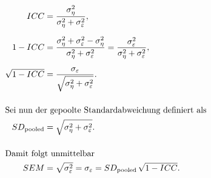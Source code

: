 \documentclass{article}
\begin{document}
\begin{align*}
ICC &= \frac{\sigma_{\eta}^{2}}{\sigma_{\eta}^{2} + \sigma_{\varepsilon}^{2}}, \\[6pt]
1 - ICC &= \frac{\sigma_{\eta}^{2} + \sigma_{\varepsilon}^{2} - \sigma_{\eta}^{2}}
               {\sigma_{\eta}^{2} + \sigma_{\varepsilon}^{2}}
         = \frac{\sigma_{\varepsilon}^{2}}
                {\sigma_{\eta}^{2} + \sigma_{\varepsilon}^{2}}, \\[6pt]
\sqrt{1 - ICC} &= 
       \frac{\sigma_{\varepsilon}}
            {\sqrt{\sigma_{\eta}^{2} + \sigma_{\varepsilon}^{2}}}. \\[12pt]
\intertext{Sei nun der gepoolte Standard­ab­weichung definiert als}
SD_{\text{pooled}} &= \sqrt{\sigma_{\eta}^{2} + \sigma_{\varepsilon}^{2}}. \\[12pt]
\intertext{Damit folgt unmittelbar}
SEM &= \sqrt{\sigma_{\varepsilon}^{2}}
      = \sigma_{\varepsilon}
      = SD_{\text{pooled}} \,\sqrt{1 - ICC}.
\end{align*}
\end{document}
